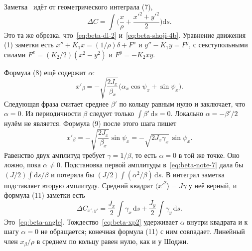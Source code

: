 Заметка~\cite{SenichevNote} идёт от геометрического интеграла (7),
\begin{equation}
\label{eq:beta-note-7}
\Delta C
=\int\Biggl(\frac{x}{\rho}+\frac{x'^2+y'^2}{2}\Biggr)\mathrm{d}s.
\end{equation}
Это та же обрезка, что~\eqref{eq:beta-dl-2} и~\eqref{eq:beta-shoji-4b}. Уравнение движения (1) заметки есть $x''+K_1 x=(1/\rho)\delta+F^x$ и $y''-K_1 y=F^y$, с секступольными силами $F^x=(K_2/2)(x^2-y^2)$ и $F^y=-K_2 xy$.

Формула (8) ещё содержит $\alpha$:
\begin{equation}
\label{eq:beta-note-8}
x'_\beta
=-\sqrt{\frac{2J_x}{\beta_x}}
\bigl(\alpha_x\cos\psi_x+\sin\psi_x\bigr).
\end{equation}
Следующая фраза считает среднее $\beta'$ по кольцу равным нулю и заключает, что $\alpha=0$. Из периодичности $\beta$ следует только $\int\beta'\,\mathrm{d}s=0$. Локально $\alpha=-\beta'/2$ нулём не является. Формула (9) после этого шага пишет
\begin{equation}
\label{eq:beta-note-9}
x'_\beta
=-\sqrt{\frac{2J_x}{\beta_x}}\sin\psi_x
=-\sqrt{2J_x\gamma_x}\,\sin\psi_x.
\end{equation}
Равенство двух амплитуд требует $\gamma=1/\beta$, то есть $\alpha=0$ в той же точке. Оно ложно, пока $\alpha\neq 0$. Подстановка первой амплитуды в~\eqref{eq:beta-note-7} дала бы $(J/2)\int\mathrm{d}s/\beta$ и потеряла бы $(J/2)\int(\alpha^2/\beta)\,\mathrm{d}s$. В интеграл заметка подставляет вторую амплитуду. Средний квадрат $\langle x'^2\rangle=J\gamma$ у неё верный, и формула (11) заметки есть
\begin{equation}
\label{eq:beta-note-11}
\Delta C_{x',y'}
=\frac{J_x}{2}\int\gamma_x\,\mathrm{d}s
+\frac{J_y}{2}\int\gamma_y\,\mathrm{d}s.
\end{equation}
Это~\eqref{eq:beta-angle}. Тождество~\eqref{eq:beta-xp2} удерживает $\alpha$ внутри квадрата и к шагу $\alpha=0$ не обращается; конечная формула (11) с ним совпадает. Линейный член $x_\beta/\rho$ в среднем по кольцу равен нулю, как и у Шоджи.

